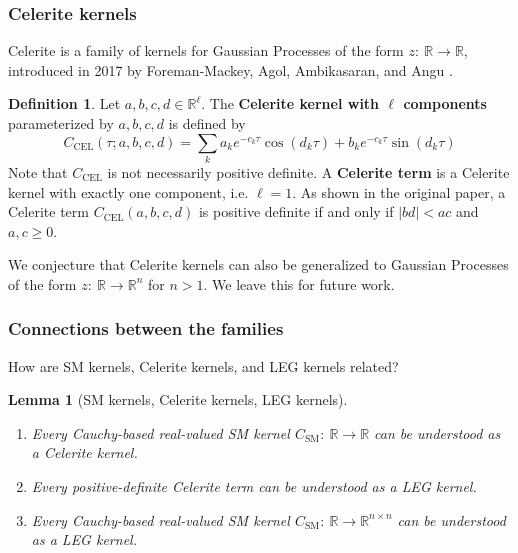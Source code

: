 \documentclass{article}
\newtheorem{lemma}{Lemma}
\theoremstyle{definition}
\newtheorem{definition}{Definition}
\newcommand{\SM}{\mathrm{SM}}
\newcommand{\CEL}{\mathrm{CEL}}
\begin{document}
\subsubsection{Celerite kernels}

Celerite is a family of kernels for Gaussian Processes of the form $z:\ \mathbb{R} \rightarrow \mathbb{R}$, introduced in 2017 by Foreman-Mackey, Agol, Ambikasaran, and Angu \cite{foreman2017celerite}.   

\begin{definition}
Let $a,b,c,d \in \mathbb{R}^\ell$.  The \textbf{Celerite kernel with $\ell$ components} parameterized by $a,b,c,d$ is defined by 
\[
C_\CEL(\tau; a,b,c,d) = \sum_k a_k  e^{-c_k\tau} \cos(d_k \tau) + b_k e^{-c_k\tau} \sin(d_k \tau)  
\]
Note that $C_\CEL$ is not necessarily positive definite.   A \textbf{Celerite term} is a Celerite kernel with exactly one component, i.e. $\ell=1$.  As shown in the original paper, a Celerite term $C_\CEL(a,b,c,d)$ is positive definite if and only if $|b d|<a c$ and $a,c \geq 0$.
\end{definition}

We conjecture that Celerite kernels can also be generalized to Gaussian Processes of the form $z:\ \mathbb{R} \rightarrow \mathbb{R}^n$ for $n>1$.  We leave this for future work.

\subsubsection{Connections between the families}

How are SM kernels, Celerite kernels, and LEG kernels related?  

\begin{lemma}[SM kernels, Celerite kernels, LEG kernels] \label{lem:smareleg}
\hspace{.01in}

\begin{enumerate}
    \item Every Cauchy-based real-valued SM kernel $C_\SM:\ \mathbb{R} \rightarrow\mathbb{R}$ can be understood as a Celerite kernel.  
    \item Every positive-definite Celerite term can be understood as a LEG kernel.
    \item Every Cauchy-based real-valued SM kernel $C_\SM:\ \mathbb{R} \rightarrow\mathbb{R}^{n \times n}$ can be understood as a LEG kernel.
\end{enumerate}
\end{lemma}
\end{document}
